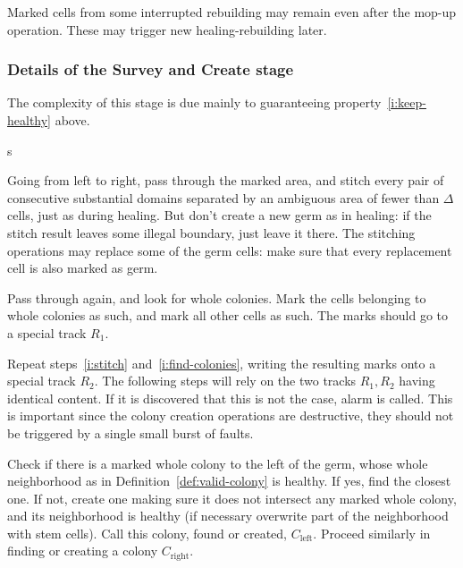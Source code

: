 \documentclass[11pt]{memoir}
\theoremstyle{definition} %
\newcommand{\Left}{\text{left}}
\newcommand{\Right}{\text{right}}
\begin{document}
Marked cells from some interrupted rebuilding may remain even after the mop-up operation.
These may trigger new healing-rebuilding later.


\subsubsection*{Details of the Survey and Create stage}

The complexity of this stage is due mainly to guaranteeing
property~\eqref{i:keep-healthy} above.

\begin{varenum}{s}
\item\label{i:stitch}
  Going from left to right,
  pass through the marked area, and stitch every pair of consecutive
  substantial domains separated by an ambiguous area of fewer than \( \Delta \) cells,
  just as during healing.
  But don't create a new germ as in healing: if the stitch result leaves some illegal boundary, just leave
  it there.
  The stitching operations may replace some of the germ cells: make sure that every replacement cell
  is also marked as germ.

\item\label{i:find-colonies}
  Pass through again, and look for whole colonies.
  Mark the cells belonging to whole colonies as such, and mark all other cells as such.
  The marks should go to a special track \( R_{1} \).

\item\label{i:repeat}
  Repeat steps~\eqref{i:stitch} and~\eqref{i:find-colonies}, writing the resulting marks onto a special
  track \( R_{2} \).
  The following steps will rely on the two tracks \( R_{1},R_{2} \) having identical content.
  If it is discovered that this is not the case, alarm is called.
  This is important since the colony creation operations are destructive, they should not be triggered by
  a single small burst of faults.
  
\item\label{i:C-left-right} Check if there is a marked whole colony to the left of the germ,
  whose whole neighborhood as in Definition~\ref{def:valid-colony} is healthy.
  If yes, find the closest one.
  If not, create one making sure it does not intersect any marked whole colony, and its
  neighborhood is healthy (if necessary overwrite part of the neighborhood with stem cells).
  Call this colony, found or created, \( C_{\Left} \).
  Proceed similarly in finding or creating a colony \( C_{\Right} \).
  

\end{varenum}
\end{document}
